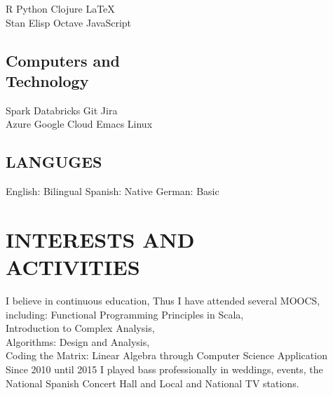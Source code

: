 \documentclass[]{deedy-resume-openfont}
\begin{document}
\begin{minipage}[t]{0.33\textwidth}
R \textbullet{} Python \textbullet{} Clojure \textbullet{} \LaTeX\ \\ 
Stan \textbullet{} Elisp \textbullet{} Octave \textbullet{} JavaScript \\

\sectionsep

\subsection{Computers and \\  Technology}

Spark \textbullet{} Databricks \textbullet{} Git \textbullet{} Jira \\
Azure  \textbullet{} Google Cloud \textbullet{} Emacs \textbullet{} Linux \\

\sectionsep

\subsection{LANGUGES}

English: Bilingual \textbullet{} Spanish: Native \textbullet{} German: Basic \\

\sectionsep

\section{INTERESTS AND \\ ACTIVITIES} 
I believe in continuous education, Thus I have attended several MOOCS, including:
Functional Programming Principles in Scala,\\
Introduction to Complex Analysis,\\
Algorithms: Design and Analysis,\\
Coding the Matrix: Linear Algebra through Computer Science Application \\
\sectionsep
Since 2010 until 2015 I played bass professionally in weddings, events, the National Spanish Concert Hall and Local and National TV stations.
\sectionsep


%
%

\end{minipage} 
\hfill
\end{document}
